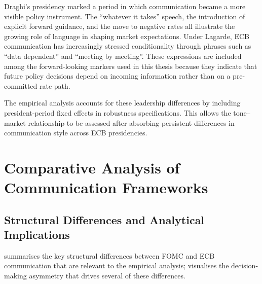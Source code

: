 Draghi's presidency marked a period in which communication became a more
visible policy instrument. The ``whatever it takes'' speech, the
introduction of explicit forward guidance, and the move to negative
rates all illustrate the growing role of language in shaping market
expectations. Under Lagarde, ECB communication has increasingly stressed
conditionality through phrases such as ``data dependent'' and
``meeting by meeting''. These expressions are included among the
forward-looking markers used in this thesis because they indicate that
future policy decisions depend on incoming information rather than on a
pre-committed rate path.

The empirical analysis accounts for these leadership differences by
including president-period fixed effects in robustness specifications.
This allows the tone--market relationship to be assessed after absorbing
persistent differences in communication style across ECB presidencies.

\section{Comparative Analysis of Communication Frameworks}
\label{sec:inst_comparison}

\subsection{Structural Differences and Analytical Implications}
\label{sec:inst_comparison_structure}

 summarises the key structural
differences between FOMC and ECB communication that are relevant
to the empirical analysis;
 visualises the decision-making
asymmetry that drives several of these differences.

